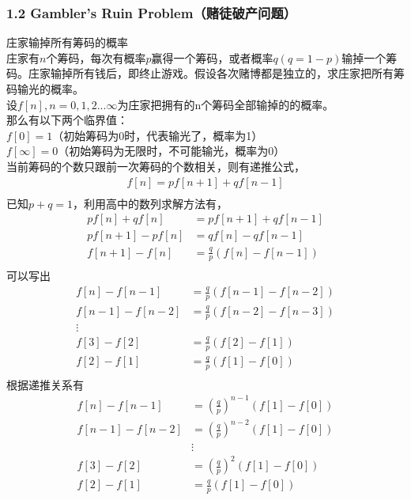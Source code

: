 \documentclass[
]{article}
\begin{document}
\hypertarget{header-n5}{%
\subsubsection{1.2 Gambler's Ruin Problem（赌徒破产问题）}\label{header-n5}}
庄家输掉所有筹码的概率\\
庄家有$n$个筹码，每次有概率$p$赢得一个筹码，或者概率$q(q=1-p)$输掉一个筹码。庄家输掉所有钱后，即终止游戏。假设各次赌博都是独立的，求庄家把所有筹码输光的概率。\\
设$f[n], n=0,1,2...\infty$为庄家把拥有的n个筹码全部输掉的的概率。\\
那么有以下两个临界值：\\
$f[0]=1$（初始筹码为0时，代表输光了，概率为1）\\
$f[\infty]=0$（初始筹码为无限时，不可能输光，概率为0）\\
当前筹码的个数只跟前一次筹码的个数相关，则有递推公式，\\
\begin{equation}
\begin{aligned}
f[n] = pf[n+1] + qf[n-1]\\
\end{aligned}
\end{equation}
已知$p+q=1$，利用高中的数列求解方法有，
\begin{equation}
\begin{aligned}
pf[n] + qf[n] &= pf[n+1] + qf[n-1]\\
pf[n+1] - pf[n] &= qf[n] - qf[n-1]\\
f[n+1] - f[n] &= \frac{q}{p}(f[n] - f[n-1])\\
\end{aligned}
\end{equation}
可以写出\\
\begin{equation}
\begin{aligned}
f[n] - f[n-1] &= \frac{q}{p}(f[n-1] - f[n-2])\\
f[n-1] - f[n-2] &= \frac{q}{p}(f[n-2] - f[n-3])\\
\vdots\\
f[3] - f[2] &= \frac{q}{p}(f[2] - f[1])\\
f[2] - f[1] &= \frac{q}{p}(f[1] - f[0])\\
\end{aligned}
\end{equation}
根据递推关系有\\
\begin{equation}
\begin{aligned}
f[n] - f[n-1] &= (\frac{q}{p})^{n-1}(f[1] - f[0])\\
f[n-1] - f[n-2] &= (\frac{q}{p})^{n-2}(f[1] - f[0])\\
&\vdots\\
f[3] - f[2] &= (\frac{q}{p})^{2}(f[1] - f[0])\\
f[2] - f[1] &= \frac{q}{p}(f[1] - f[0])\\
\end{aligned}
\end{equation}
\end{document}
